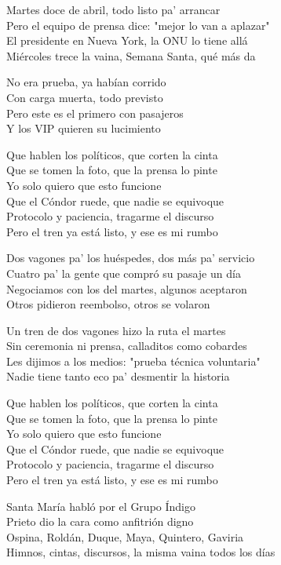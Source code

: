 \begin{lyrics}
Martes doce de abril, todo listo pa' arrancar\\
Pero el equipo de prensa dice: "mejor lo van a aplazar"\\
El presidente en Nueva York, la ONU lo tiene allá\\
Miércoles trece la vaina, Semana Santa, qué más da

No era prueba, ya habían corrido\\
Con carga muerta, todo previsto\\
Pero este es el primero con pasajeros\\
Y los VIP quieren su lucimiento

Que hablen los políticos, que corten la cinta\\
Que se tomen la foto, que la prensa lo pinte\\
Yo solo quiero que esto funcione\\
Que el Cóndor ruede, que nadie se equivoque\\
Protocolo y paciencia, tragarme el discurso\\
Pero el tren ya está listo, y ese es mi rumbo

Dos vagones pa' los huéspedes, dos más pa' servicio\\
Cuatro pa' la gente que compró su pasaje un día\\
Negociamos con los del martes, algunos aceptaron\\
Otros pidieron reembolso, otros se volaron

Un tren de dos vagones hizo la ruta el martes\\
Sin ceremonia ni prensa, calladitos como cobardes\\
Les dijimos a los medios: "prueba técnica voluntaria"\\
Nadie tiene tanto eco pa' desmentir la historia

Que hablen los políticos, que corten la cinta\\
Que se tomen la foto, que la prensa lo pinte\\
Yo solo quiero que esto funcione\\
Que el Cóndor ruede, que nadie se equivoque\\
Protocolo y paciencia, tragarme el discurso\\
Pero el tren ya está listo, y ese es mi rumbo

Santa María habló por el Grupo Índigo\\
Prieto dio la cara como anfitrión digno\\
Ospina, Roldán, Duque, Maya, Quintero, Gaviria\\
Himnos, cintas, discursos, la misma vaina todos los días


\end{lyrics}
